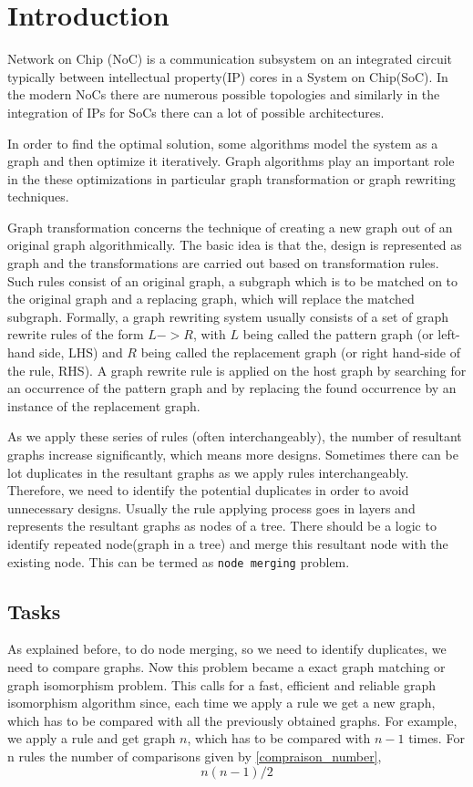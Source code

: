 \chapter{Introduction}\label{chapter:introduction}

Network on Chip (NoC) is a communication subsystem on an integrated circuit typically between intellectual property(IP) cores in a System on Chip(SoC). In the modern NoCs there are numerous possible topologies and similarly in the integration of IPs for SoCs there can a lot of possible architectures. 

In order to find the optimal solution, some algorithms model the system as a graph and then optimize it iteratively. Graph algorithms play an important role in the these optimizations in particular graph transformation or graph rewriting techniques.

Graph transformation concerns the technique of creating a new graph out of an original graph algorithmically. The basic idea is that the,
design is represented as graph and the transformations are carried out based on transformation rules. Such rules consist of an original graph,
a subgraph which is to be matched on to the original graph and a replacing graph, which will replace the matched subgraph. 
Formally, a graph rewriting system usually consists of a set of graph rewrite rules of the form $L -> R$, with $L$ being called the pattern graph (or left-hand side, LHS) and $R$ being called the replacement graph (or right hand-side of the rule, RHS). A graph rewrite rule is applied on the host graph by searching for an occurrence of the pattern graph and by replacing the found occurrence by an instance of the replacement graph.

As we apply these series of rules (often interchangeably), the number of resultant graphs increase significantly, which means more designs. Sometimes there can be lot duplicates
in the resultant graphs as we apply rules interchangeably. Therefore, we need to identify the potential duplicates in order to avoid unnecessary designs. Usually the rule applying process goes in layers and represents the resultant graphs as nodes of a tree. There should be a logic to identify repeated node(graph in a tree) and merge this resultant node with the existing node. This can be termed as \texttt{node merging} problem. 

\section{Tasks}
As explained before, to do node merging, so we need to identify duplicates, we need to compare graphs. Now this problem became a exact graph matching or graph isomorphism problem. This calls for a fast, efficient and reliable graph isomorphism algorithm since, each time we apply a rule we get a new graph, which has to be compared with all the previously obtained graphs. 
For example, we apply a rule and get graph $n$, which has to be compared with $n-1$ times. For n rules the number of comparisons given by \ref{compraison_number}, 
\begin{equation}
            n(n-1)/2 
        \label{compraison_number}
\end{equation}

